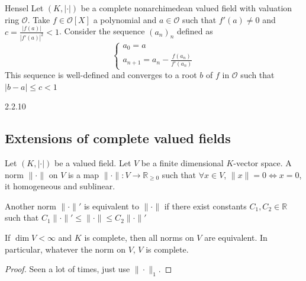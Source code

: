 \begin{lemmao}{Hensel}
    Let \({(K, |\cdot|)}\) be a complete nonarchimedean valued field with
    valuation ring \(\mathcal{O}\). Take \(f \in  \mathcal{O}[X]\) a polynomial
    and \(a \in \mathcal{O}\) such that \(f'{(a)} \neq 0\) and \(c =
    \frac{|f{(a)}|}{|f'{(a)}|^2} < 1\). Consider the sequence \({(a_{n})}_n\)
    defined as
    \[
      \begin{cases}{}
          a_{0} = a\\
          a_{n+1} = a_{n} - \frac{f{(a_{n})}}{f'{(a_{n})}}
      \end{cases}
    \]
    This sequence is well-defined and converges to a root \(b\) of \(f\) in
    \(\mathcal{O}\) such that \(|b-a| \le c < 1\) 
\end{lemmao}

\begin{eser}{2.2.10}
    
\end{eser}

\subsection{Extensions of complete valued fields}

\begin{definition}{}
    Let \({(K, |\cdot |)}\) be a valued field. Let \(V\) be a finite dimensional
    \(K\)-vector space. A norm \(\|\cdot \|\) on \(V\) is a map \(\|\cdot \| :
    V \to \mathbb{R}_{\ge 0} \) such that \(\forall x \in V\), \(\|x\| = 0 \iff
    x = 0\), it homogeneous and sublinear.

    Another norm \(\|\cdot \|'\) is equivalent to \(\|\cdot \|\) if there exist
    constants \(C_{1}, C_{2} \in \mathbb{R}\) such that \(C_{1}\|\cdot \|' \le
    \|\cdot \| \le C_{2} \|\cdot \|'\) 
\end{definition}

\begin{proposition}{}
    If \(\dim V < \infty\) and \(K\) is complete, then all norms on \(V\) are
    equivalent. In particular, whatever the norm on \(V\), \(V\) is complete.
\end{proposition}
\begin{proof}{}
    Seen a lot of times, just use \(\|\cdot \|_1\).
\end{proof}

